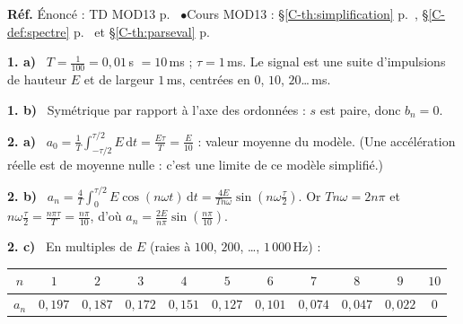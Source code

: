 \documentclass[a4paper,11pt]{article}
\newcommand{\cours}[1]{§\ref{C-#1} p.~\pageref{C-#1}}
\newcommand{\source}[2]{{\footnotesize\color{uimmgray}\textbf{Réf.} \enspace Énoncé : TD MOD13 p.~\pageref{T-#1} \enspace$\bullet$\enspace Cours MOD13 : #2}\par\smallskip}
\newcommand{\q}[1]{\textbf{\color{uimmblue}#1}\ }
\begin{document}
\begin{correction}
\source{exo:pb}{\cours{th:simplification}, \cours{def:spectre} et \cours{th:parseval}}
\q{1. a)} $T = \frac{1}{100} = 0{,}01$\,s $= 10$\,ms ; $\tau = 1$\,ms. Le signal est une suite d'impulsions de hauteur $E$ et de largeur $1$\,ms, centrées en $0$, $10$, $20$\dots\,ms.

\q{1. b)} Symétrique par rapport à l'axe des ordonnées : $s$ est paire, donc $b_n = 0$.

\q{2. a)} $a_0 = \frac1T\int_{-\tau/2}^{\tau/2}E\,\mathrm dt = \frac{E\tau}{T} = \frac{E}{10}$ : valeur moyenne du modèle. (Une accélération réelle est de moyenne nulle : c'est une limite de ce modèle simplifié.)

\q{2. b)} $a_n = \frac4T\int_0^{\tau/2}E\cos(n\omega t)\,\mathrm dt = \frac{4E}{Tn\omega}\sin\left(n\omega\frac\tau2\right)$. Or $Tn\omega = 2n\pi$ et $n\omega\frac\tau2 = \frac{n\pi\tau}{T} = \frac{n\pi}{10}$, d'où $a_n = \frac{2E}{n\pi}\sin\left(\frac{n\pi}{10}\right)$.

\q{2. c)} En multiples de $E$ (raies à $100$, $200$, \dots, $1\,000$\,Hz) :
\begin{center}
\renewcommand{\arraystretch}{1.3}
\begin{tabular}{|c|c|c|c|c|c|c|c|c|c|c|}
\hline
\rowcolor{uimmlightblue}
$n$ & $1$ & $2$ & $3$ & $4$ & $5$ & $6$ & $7$ & $8$ & $9$ & $10$ \\
\hline
$a_n$ & $0{,}197$ & $0{,}187$ & $0{,}172$ & $0{,}151$ & $0{,}127$ & $0{,}101$ & $0{,}074$ & $0{,}047$ & $0{,}022$ & $0$ \\
\hline
\end{tabular}
\end{center}
\begin{center}
\end{center}


\end{correction}
\end{document}

